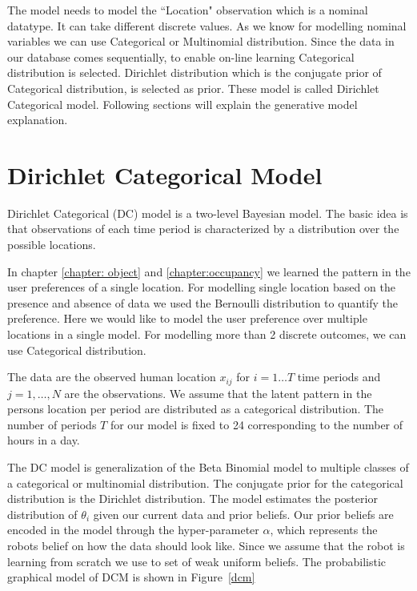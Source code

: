 The model needs to model the ``Location" observation which is a nominal datatype. It can take different discrete values. As we know for modelling nominal variables we can use Categorical or Multinomial distribution. Since the data in our database comes sequentially, to enable on-line learning Categorical distribution is selected. Dirichlet distribution which is the conjugate prior of Categorical distribution, is selected as prior. These model is called Dirichlet Categorical model. Following sections will explain the generative model explanation.


\section{Dirichlet Categorical Model }

Dirichlet Categorical (DC) model  is a two-level Bayesian model. The basic idea is that observations of each time period is characterized by a distribution over the possible locations.

In chapter \ref{chapter: object} and \ref{chapter:occupancy} we learned the pattern in the user preferences of a single location. For modelling single location based on the presence and absence of data we used the Bernoulli distribution to quantify the preference. Here we would like to model the user preference over multiple locations in a single model. For modelling more than 2 discrete outcomes, we can use Categorical distribution. 

The data are the observed human location $x_{ij}$ for $i = 1 \dots T$ time periods and $j = 1, \dots , N$  are the observations.  We assume that the latent pattern in the persons location per period are distributed as a categorical distribution. The number of periods $T$ for our model is fixed to 24 corresponding to the number of hours in a day. 

The DC model is generalization of the Beta Binomial model to multiple classes of a categorical or multinomial distribution. The conjugate prior for the categorical distribution is the Dirichlet distribution. The model estimates the posterior distribution of $\theta_i$ given our current data and prior beliefs. Our prior beliefs are encoded in the model through the hyper-parameter $\alpha$, which represents  the robots belief on how the data should look like. Since we assume that the robot is learning from scratch we use to set of weak uniform beliefs. The probabilistic graphical model of  DCM is shown in Figure~\ref{dcm}

